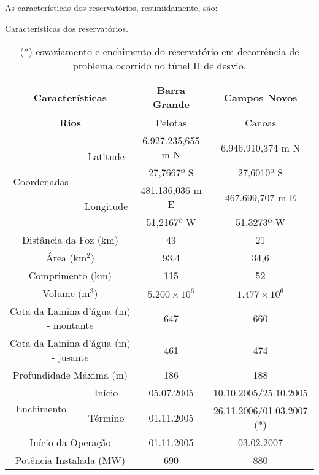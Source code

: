 \newpage
\par{As características dos reservatórios, resumidamente, são:}
\begin{table}[h!]
\begin{small}
\centering
\captionsetup{justification=justified,singlelinecheck=false}
\caption{Características dos reservatórios.}
\begin{tabular}{|c|c|c|c|}
\hline
\multicolumn{2}{|c|}{\textbf{Características}} & \textbf{Barra Grande} & \textbf{Campos Novos} \\
\hline
\multicolumn{2}{|c|}{\textbf{Rios}} & Pelotas & Canoas \\
\hline
    \multirow{4}{*}{Coordenadas}
        & \multirow{2}{*}{Latitude}
            & 6.927.235,655 m N & 6.946.910,374 m N \\
            \cline{3-4}
            && 27,7667º S & 27,6010º S\\
            \cline{2-4}
        & \multirow{2}{*}{Longitude}
            & 481.136,036 m E & 467.699,707 m E \\
            \cline{3-4}
            && 51,2167º W & 51,3273º W \\
\hline
\multicolumn{2}{|c|}{Distância da Foz (km)} & 43 &  21 \\ \hline
\multicolumn{2}{|c|}{Área (km$^2$)} & 93,4 &  34,6 \\ \hline
\multicolumn{2}{|c|}{Comprimento (km)} & 115 &  52 \\ \hline
\multicolumn{2}{|c|}{Volume (m$^3$)} & $5.200 \times 10^6$ &  $1.477 \times 10^6$ \\ \hline
\multicolumn{2}{|c|}{Cota da Lamina d'água (m) - montante} & 647 &  660 \\ \hline
\multicolumn{2}{|c|}{Cota da Lamina d'água (m) - jusante} & 461 &  474 \\ \hline
\multicolumn{2}{|c|}{Profundidade Máxima (m)} & 186 &  188 \\ \hline
    \multirow{2}{*}{Enchimento}
        & Início & 05.07.2005 & 10.10.2005/25.10.2005 \\
        \cline{2-4}
        & Término & 01.11.2005 & 26.11.2006/01.03.2007 (*) \\
        \hline
\multicolumn{2}{|c|}{Início da Operação} & 01.11.2005 & 03.02.2007 \\ \hline
\multicolumn{2}{|c|}{Potência Instalada (MW)} &  690 & 880 \\ \hline
\end{tabular}
\caption*{(*) esvaziamento e enchimento do reservatório em decorrência de problema ocorrido no túnel II de desvio.}
\end{small}
\end{table}
\newpage

